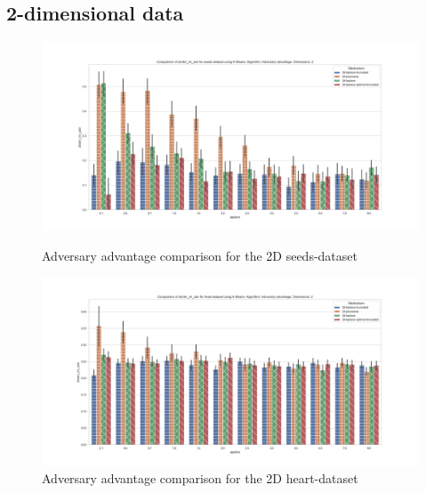 \subsection{2-dimensional data}
\begin{figure}[H]
    \centering
    \begin{minipage}[c]{0.8\textwidth}
        \includegraphics[width=1\textwidth]{Results/RQ1/seeds-dataset/shokri_mi_adv_seeds-dataset_comparison.png}
        \caption{Adversary advantage comparison for the 2D seeds-dataset}
        \label{fig:appendix-mi_seeds-dataset_comparison_2d}
    \end{minipage}
    \begin{minipage}[c]{0.8\textwidth}
        \includegraphics[width=1\textwidth]{Results/RQ1/heart-dataset/shokri_mi_adv_heart-dataset_comparison.png}
        \caption{Adversary advantage comparison for the 2D heart-dataset}
        \label{fig:appendix-mi_heart-dataset_comparison_2d}
    \end{minipage}

\end{figure}
